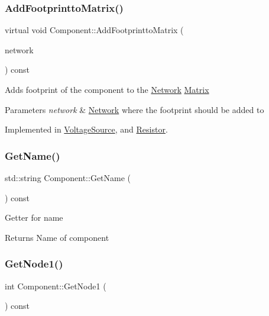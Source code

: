 \subsubsection{\texorpdfstring{Add\+Footprintto\+Matrix()}{AddFootprinttoMatrix()}}
{\footnotesize\ttfamily virtual void Component\+::\+Add\+Footprintto\+Matrix (\begin{DoxyParamCaption}\item[{class \hyperlink{classNetwork}{Network} \&}]{network }\end{DoxyParamCaption}) const\hspace{0.3cm}{\ttfamily [pure virtual]}}

Adds footprint of the component to the \hyperlink{classNetwork}{Network} \hyperlink{classMatrix}{Matrix} 
\begin{DoxyParams}{Parameters}
{\em network} & \hyperlink{classNetwork}{Network} where the footprint should be added to \\
\hline
\end{DoxyParams}


Implemented in \hyperlink{classVoltageSource_a74f8a6a57480e9cff24414e106d2bbf1}{Voltage\+Source}, and \hyperlink{classResistor_a1e2d669a6b28b5b46457af5caae7462c}{Resistor}.

\mbox{\label{classComponent_a9af52e1878212622948ab2189f4f29dd}} 
\subsubsection{\texorpdfstring{Get\+Name()}{GetName()}}
{\footnotesize\ttfamily std\+::string Component\+::\+Get\+Name (\begin{DoxyParamCaption}{ }\end{DoxyParamCaption}) const\hspace{0.3cm}{\ttfamily [inline]}}

Getter for name \begin{DoxyReturn}{Returns}
Name of component 
\end{DoxyReturn}
\mbox{\label{classComponent_af6503c2bf9a88eff198ffbfcc3e24876}} 
\subsubsection{\texorpdfstring{Get\+Node1()}{GetNode1()}}
{\footnotesize\ttfamily int Component\+::\+Get\+Node1 (\begin{DoxyParamCaption}{ }\end{DoxyParamCaption}) const\hspace{0.3cm}{\ttfamily [inline]}}

